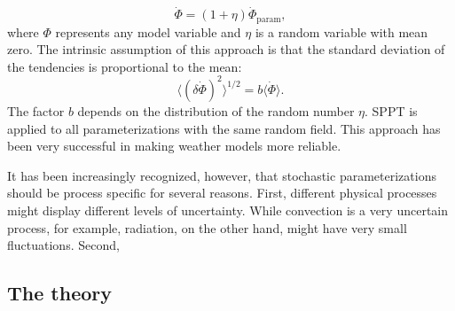 \documentclass[a4paper, 12pt]{article}
\begin{document}
\begin{equation} \label{eq:SPPT}
 \dot{\Phi} = (1 + \eta) \dot{\Phi}_{\mathrm{param}},
\end{equation}
where $\Phi$ represents any model variable and $\eta$ is a random variable with mean zero. The intrinsic assumption of this approach is that the standard deviation of the tendencies is proportional to the mean:
\begin{equation} \label{eq:SPPT_std}
 \langle (\delta \dot{\Phi})^2 \rangle^{1/2} = b \langle \dot{\Phi} \rangle.
\end{equation}
The factor $b$ depends on the distribution of the random number $\eta$. SPPT is applied to all parameterizations with the same random field. This approach has been very successful in making weather models more reliable.

It has been increasingly recognized, however, that stochastic parameterizations should be process specific for several reasons. First, different physical processes might display different levels of uncertainty. While convection is a very uncertain process, for example, radiation, on the other hand, might have very small fluctuations. Second, 

\subsection{The \cite{Craig2006} theory}
\end{document}
